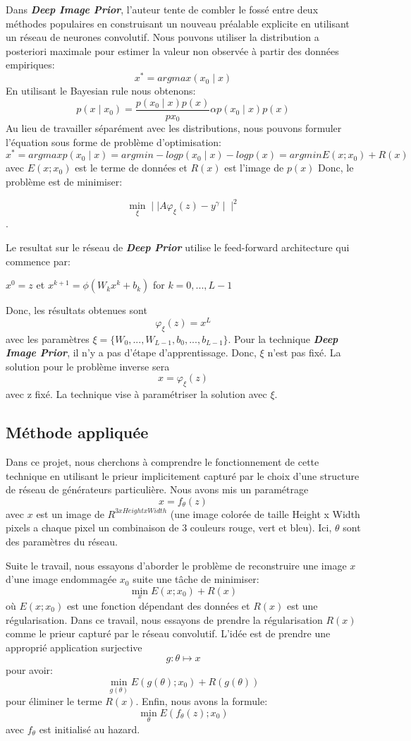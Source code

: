 \documentclass[
  12pt,
  dvipsnames]{article}
\begin{document}
Dans \textbf{\emph{Deep Image Prior}}, l'auteur tente de combler le fossé entre deux méthodes populaires en construisant un nouveau préalable explicite en utilisant un réseau de neurones convolutif. Nous pouvons utiliser la distribution a posteriori maximale pour estimer la valeur non observée à partir des données empiriques:
\[x^* = argmax (x_{0}\mid x)\]
En utilisant le Bayesian rule nous obtenons:
\[p(x\mid x_{0}) = \frac{p(x_{0}\mid x) p(x)} {p{x_0}} \alpha p(x_{0}\mid x) p(x)\]
Au lieu de travailler séparément avec les distributions, nous pouvons formuler l'équation sous forme de problème d'optimisation:
\[x^* = arg max p(x_{0}\mid x) = arg min - log p(x_{0} \mid x) - log p(x) = arg min E(x;x_{0}) +R(x)\] avec \(E(x;x_{0})\) est le terme de données et \(R(x)\) est l'image de \(p(x)\)
Donc, le problème est de minimiser:

\[\min_{\xi} \mid\mid A\varphi_\xi(z) - y^\gamma \mid\mid^2\].

Le resultat sur le réseau de \textbf{\emph{Deep Prior}} utilise le feed-forward architecture qui commence par:

\begin{center} $x^0 = z$    et    $x^{k+1} = \phi (W_k x^k + b_k)$ for $k = 0,...,L-1$  \end{center}

Donc, les résultats obtenues sont \[\varphi_\xi(z) = x^L\] avec les paramètres \(\xi = \{W_0,...,W_{L-1},b_0,...,b_{L-1}\}\).
Pour la technique \textbf{\emph{Deep Image Prior}}, il n'y a pas d'étape d'apprentissage. Donc, \(\xi\) n'est pas fixé.
La solution pour le problème inverse sera \[x=\varphi_\xi(z)\] avec z fixé. La technique vise à paramétriser la solution avec \(\xi\).

\hypertarget{muxe9thode-appliquuxe9e}{%
\subsection{Méthode appliquée}\label{muxe9thode-appliquuxe9e}}

Dans ce projet, nous cherchons à comprendre le fonctionnement de cette technique
en utilisant le prieur implicitement capturé par le choix d'une structure de réseau de générateurs particulière.
Nous avons mis un paramétrage \[x = f_\theta(z)\] avec \(x\) est un image de \(R^{3xHeightxWidth}\) (une image colorée de taille
Height x Width pixels a chaque pixel un combinaison de 3 couleurs rouge, vert et bleu).
Ici, \(\theta\) sont des paramètres du réseau.

Suite le travail, nous essayons d'aborder le problème de reconstruire une image \(x\) d'une image endommagée \(x_0\) suite une tâche de minimiser: \[\min_{x} E(x;x_0) + R(x)\] où \(E(x;x_0)\) est une fonction dépendant des données et \(R(x)\) est une régularisation. Dans ce travail, nous essayons de prendre la régularisation \(R(x)\) comme le prieur capturé par le réseau convolutif. L'idée est de prendre une approprié application surjective \[g: \theta \mapsto x\] pour avoir: \[\min_{g(\theta)} E(g(\theta);x_0) + R(g(\theta))\] pour éliminer le terme \(R(x)\). Enfin, nous avons la formule: \[\min_{\theta} E(f_{\theta}(z);x_0)\] avec \(f_{\theta}\) est initialisé au hazard.
\end{document}

